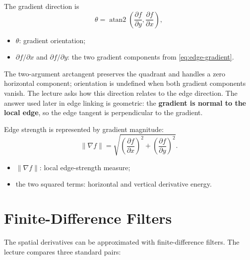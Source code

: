 \documentclass[11pt,a4paper,oneside]{report}
\newcommand{\mathlegend}[1]{%
  \par\vspace{0.2em}{\small\itshape where}\par
  \begin{itemize}[leftmargin=1.7em,topsep=0.15em,itemsep=0.12em]
  #1
  \end{itemize}
}
\begin{document}
The gradient direction is
\begin{equation}
  \theta = \operatorname{atan2}\!\left(\frac{\partial f}{\partial y},\frac{\partial f}{\partial x}\right),
  \label{eq:edge-gradient-direction}
\end{equation}
\mathlegend{
  \item $\theta$: gradient orientation;
  \item $\partial f/\partial x$ and $\partial f/\partial y$: the two gradient components from \cref{eq:edge-gradient}.
}
The two-argument arctangent preserves the quadrant and handles a zero horizontal component; orientation is undefined when both gradient components vanish. The lecture asks how this direction relates to the edge direction. The answer used later in edge linking is geometric: the \textbf{gradient is normal to the local edge}, so the edge tangent is perpendicular to the gradient.

Edge strength is represented by gradient magnitude:
\begin{equation}
  \lVert \nabla f\rVert
  =\sqrt{\left(\frac{\partial f}{\partial x}\right)^2
  +\left(\frac{\partial f}{\partial y}\right)^2}.
  \label{eq:edge-gradient-magnitude}
\end{equation}
\mathlegend{
  \item $\lVert\nabla f\rVert$: local edge-strength measure;
  \item the two squared terms: horizontal and vertical derivative energy.
}

\section{Finite-Difference Filters}

The spatial derivatives can be approximated with finite-difference filters. The lecture compares three standard pairs:
\end{document}
